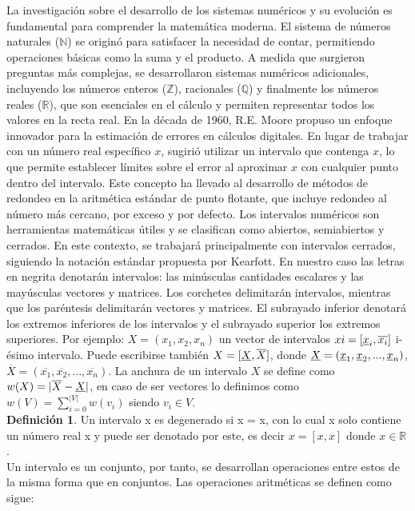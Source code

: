 \documentclass{article}
\begin{document}
La investigación sobre el desarrollo de los sistemas numéricos y su evolución es fundamental para comprender la matemática moderna. El sistema de números naturales
($\mathbb{N}$) se originó para satisfacer la necesidad de contar, permitiendo operaciones básicas como la suma y el producto. A medida que surgieron preguntas más
complejas, se desarrollaron sistemas numéricos adicionales, incluyendo los números enteros ($\mathbb{Z}$), racionales ($\mathbb{Q} $) y finalmente los números reales
 ($\mathbb{R}$), que son esenciales en el cálculo y permiten representar todos los valores en la recta real. En la década de 1960, R.E. Moore propuso un enfoque 
 innovador para la estimación de errores en cálculos digitales. En lugar de trabajar con un número real específico $x$, sugirió utilizar un intervalo que contenga
$x$, lo que permite establecer límites sobre el error al aproximar $x$ con cualquier punto dentro del intervalo. Este concepto ha llevado al desarrollo de métodos
de redondeo en la aritmética estándar de punto flotante, que incluye redondeo al número más cercano, por exceso y por defecto. Los intervalos numéricos son herramientas
matemáticas útiles y se clasifican como abiertos, semiabiertos y cerrados. En este contexto, se trabajará principalmente con intervalos cerrados, siguiendo la notación
estándar propuesta por Kearfott. En nuestro caso las letras en negrita denotarán intervalos: las minúsculas cantidades escalares y las mayúsculas vectores y matrices.
Los corchetes delimitarán intervalos, mientras que los paréntesis delimitarán vectores y matrices. El subrayado inferior denotará los extremos inferiores de los intervalos
y el subrayado superior los extremos superiores. Por ejemplo: $X = (x_1, x_2, x_n)$ un vector de intervalos $xi = [ \uline x_i, \overline{ x_i } ]$ i-ésimo intervalo.
Puede escribirse también $X = [ \uline X, \overline{ X } ]$, donde $\uline X = ( \uline x_1, \uline x_2, ..., \uline x_n)$, $\overline{X}= (\overline{x_1}, \overline{x_2}, ..., \overline{x_n})$.
La anchura de un intervalo $X$ se define como $w(X)=| \overline{X} - \uline X|$, en caso de ser vectores lo definimos como $w(V)=\sum_{i=0}^{|V|}w(v_i)$ siendo $v_i \in V$. \\

\textbf{ Definición 1}. Un intervalo x es degenerado si x = x, con lo cual x solo contiene un
número real x y puede ser denotado por este, es decir $x = [x,x]$ donde $x \in \mathbb{R}$.\\

Un intervalo es un conjunto, por tanto, se desarrollan operaciones entre estos de la misma forma que en conjuntos. Las operaciones aritméticas se definen como sigue:
\end{document}
